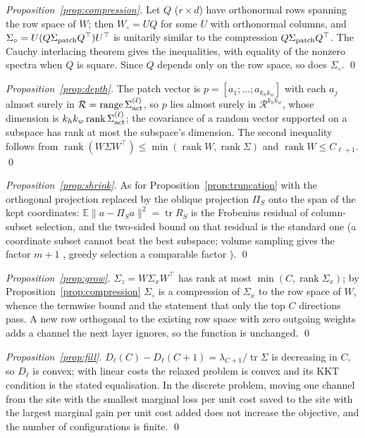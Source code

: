 \documentclass[10pt,journal,compsoc]{IEEEtran}
\begin{document}
\emph{Proposition~\ref{prop:compression}.} Let $Q$ ($r \times d$) have
orthonormal rows spanning the row space of $W$; then
$W_{\circ} = U Q$ for some $U$ with orthonormal columns, and
$\Sigma_{\circ} = U (Q \Sigma_{\rm patch} Q^{\top}) U^{\top}$ is unitarily similar
to the compression $Q \Sigma_{\rm patch} Q^{\top}$. The Cauchy interlacing
theorem \cite[Thm.~4.3.28]{horn2013matrix} gives the inequalities, with
equality of the nonzero spectra when $Q$ is square. Since $Q$ depends only
on the row space, so does $\Sigma_{\circ}$. \qed

\emph{Proposition~\ref{prop:depth}.} The patch vector is
$p = [a_1; \ldots; a_{k_h k_w}]$ with each $a_j$ almost surely in
$\mathcal{R} = \operatorname{range} \Sigma_{\rm act}^{(\ell)}$, so $p$ lies
almost surely in $\mathcal{R}^{k_h k_w}$, whose dimension is
$k_h k_w \operatorname{rank} \Sigma_{\rm act}^{(\ell)}$; the covariance of a
random vector supported on a subspace has rank at most the subspace's
dimension. The second inequality follows from
$\operatorname{rank}(W \Sigma W^{\top}) \le \min(\operatorname{rank} W,
\operatorname{rank} \Sigma)$ and $\operatorname{rank} W \le C_{\ell + 1}$. \qed



\emph{Proposition~\ref{prop:shrink}.} As for Proposition~\ref{prop:truncation} with the orthogonal projection replaced by the oblique projection $\Pi_S$ onto the span of the kept coordinates: $\mathbb{E}\|a - \Pi_S a\|^2 = \operatorname{tr} R_S$ is the Frobenius residual of column-subset selection, and the two-sided bound on that residual is the standard one (a coordinate subset cannot beat the best subspace; volume sampling gives the factor $m+1$ \cite{deshpande2006volume}, greedy selection a comparable factor \cite{civril2009greedy}). \qed

\emph{Proposition~\ref{prop:grow}.} $\Sigma_z = W\Sigma_x W^{\top}$ has rank at most $\min(C, \operatorname{rank}\Sigma_x)$; by Proposition~\ref{prop:compression} $\Sigma_{\circ}$ is a compression of $\Sigma_x$ to the row space of $W$, whence the termwise bound and the statement that only the top $C$ directions pass. A new row orthogonal to the existing row space with zero outgoing weights adds a channel the next layer ignores, so the function is unchanged. \qed

\emph{Proposition~\ref{prop:fill}.} $D_\ell(C) - D_\ell(C+1) = \lambda_{C+1}/\operatorname{tr}\Sigma$ is decreasing in $C$, so $D_\ell$ is convex; with linear costs the relaxed problem is convex and its KKT condition is the stated equalisation. In the discrete problem, moving one channel from the site with the smallest marginal loss per unit cost saved to the site with the largest marginal gain per unit cost added does not increase the objective, and the number of configurations is finite. \qed
\end{document}
